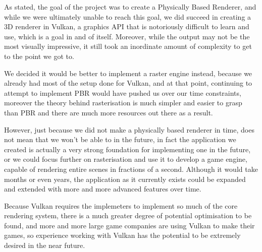 \documentclass[../report.tex]{subfiles}
\begin{document}
As stated, the goal of the project was to create a Physically Based Renderer, and while we were ultimately unable to reach this goal, we did succeed in creating a 3D renderer in Vulkan, a graphics API that is notoriously difficult to learn and use, which is a goal in and of itself. Moreover, while the output may not be the most visually impressive, it still took an inordinate amount of complexity to get to the point we got to.

We decided it would be better to implement a raster engine instead, because we already had most of the setup done for Vulkan, and at that point, continuing to attempt to implement PBR would have pushed us over our time constraints, moreover the theory behind rasterisation is much simpler and easier to grasp than PBR and there are much more resources out there as a result.

However, just because we did not make a physically based renderer in time, does not mean that we won't be able to in the future, in fact the application we created is actually a very strong foundation for implementing one in the future, or we could focus further on rasterisation and use it to develop a game engine, capable of rendering entire scenes in fractions of a second.
Although it would take months or even years, the application as it currently exists could be expanded and extended with more and more advanced features over time.

Because Vulkan requires the implemeters to implement so much of the core rendering system, there is a much greater degree of potential optimisation to be found, and more and more large game companies are using Vulkan to make their games, so experience working with Vulkan has the potential to be extremely desired in the near future.
\end{document}
